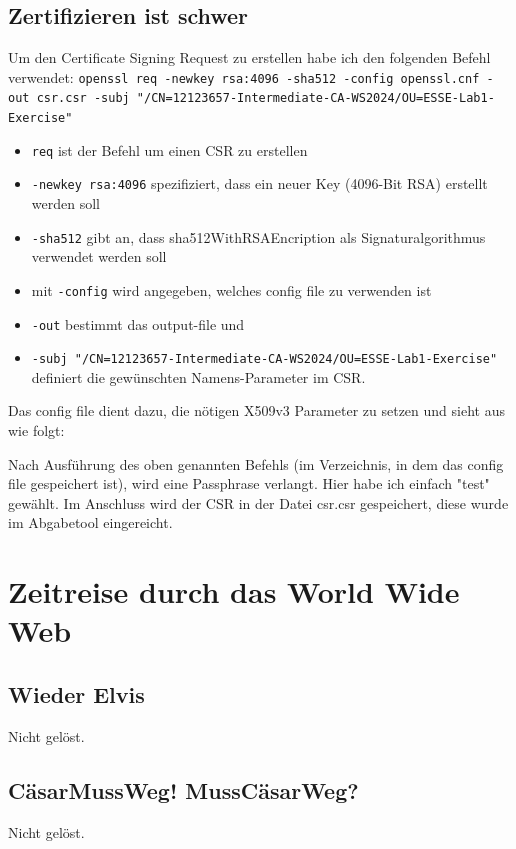 \documentclass[12pt, a4paper, titlepage, oneside]{scrartcl}
\begin{document}
	\subsection{Zertifizieren ist schwer}
	Um den Certificate Signing Request zu erstellen habe ich den folgenden Befehl
	verwendet: \lstinline{openssl req -newkey rsa:4096 -sha512 -config openssl.cnf -out csr.csr -subj "/CN=12123657-Intermediate-CA-WS2024/OU=ESSE-Lab1-Exercise"}
	\begin{itemize}
		\item \lstinline{req} ist der Befehl um einen CSR zu erstellen

		\item \lstinline{-newkey rsa:4096} spezifiziert, dass ein neuer Key (4096-Bit
			RSA) erstellt werden soll

		\item \lstinline{-sha512} gibt an, dass sha512WithRSAEncription als Signaturalgorithmus
			verwendet werden soll

		\item mit \lstinline{-config} wird angegeben, welches config file zu verwenden
			ist

		\item \lstinline{-out} bestimmt das output-file und

		\item \lstinline{-subj "/CN=12123657-Intermediate-CA-WS2024/OU=ESSE-Lab1-Exercise"}
			definiert die gewünschten Namens-Parameter im CSR.
	\end{itemize}
	Das config file dient dazu, die nötigen X509v3 Parameter zu setzen und sieht aus
	wie folgt:
	
	Nach Ausführung des oben genannten Befehls (im Verzeichnis, in dem das config file gespeichert ist), wird eine Passphrase verlangt. Hier habe ich einfach "test" gewählt. Im Anschluss wird der CSR in der Datei csr.csr gespeichert,
	diese wurde im Abgabetool eingereicht.

	\section{Zeitreise durch das World Wide Web}

	\subsection{Wieder Elvis}
	Nicht gelöst.

	\subsection{C\"asarMussWeg! MussC\"asarWeg?}
	Nicht gelöst.
\end{document}

